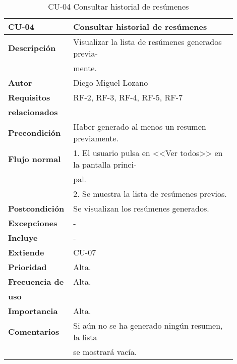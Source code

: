 \begin{longtable}{>{\raggedright}b{0.2\linewidth}>{\raggedright\arraybackslash}b{0.7\linewidth}}
	\toprule
	\textbf{CU-04} & \textbf{Consultar historial de resúmenes} \\
	\toprule
	\endhead
	
	\toprule
	\caption{CU-04 Consultar historial de resúmenes}
	\endfoot
	
	\small{\textbf{Descripción}} & Visualizar la lista de resúmenes generados previa- \\
	& mente. \\
	\small{\textbf{Autor}} & Diego Miguel Lozano \\
	\small{\textbf{Requisitos}} & RF-2, RF-3, RF-4, RF-5, RF-7  \\
	\small{\textbf{relacionados}} & \\
	\small{\textbf{Precondición}} & Haber generado al menos un resumen previamente. \\
	\small{\textbf{Flujo normal}} & \quad \small{1. El usuario pulsa en <<Ver todos>> en la pantalla princi-} \\
	& \qquad \small{pal.} \\
	& \quad \small{2. Se muestra la lista de resúmenes previos.} \\
	\small{\textbf{Postcondición}} & Se visualizan los resúmenes generados. \\
	\small{\textbf{Excepciones}} & - \\
	\small{\textbf{Incluye}} & - \\
	\small{\textbf{Extiende}} & CU-07 \\
	\small{\textbf{Prioridad}} & Alta. \\
	\small{\textbf{Frecuencia de}} & Alta. \\
	\small{\textbf{uso}} & \\
	\small{\textbf{Importancia}} & Alta. \\
	\small{\textbf{Comentarios}} & Si aún no se ha generado ningún resumen, la lista\\
	& se mostrará vacía. \\
\end{longtable}


